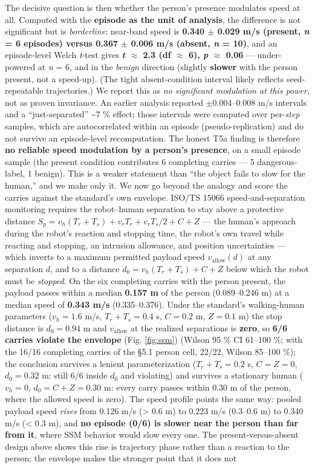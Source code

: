 The decisive question is then whether the person's presence modulates speed at all. Computed with the \textbf{episode as the unit of analysis}, the difference is not significant but is \emph{borderline}: near-band speed is \textbf{0.340 $\pm$ 0.029 m/s (present, \emph{n} = 6 episodes) versus 0.367 $\pm$ 0.006 m/s (absent, \emph{n} = 10)}, and an episode-level Welch \emph{t}-test gives \textbf{\emph{t} $\approx$ 2.3 (df $\approx$ 6), \emph{p} $\approx$ 0.06} --- under-powered at \emph{n} = 6, and in the \emph{benign} direction (slightly \textbf{slower} with the person present, not a speed-up). (The tight absent-condition interval likely reflects seed-repeatable trajectories.) We report this as \emph{no significant modulation at this power}, not as proven invariance. An earlier analysis reported $\pm$0.004--0.008 m/s intervals and a ``just-separated'' \textasciitilde{}7 \% effect; those intervals were computed over per-\emph{step} samples, which are autocorrelated within an episode (pseudo-replication) and do not survive an episode-level recomputation. The honest T5a finding is therefore \textbf{no reliable speed modulation by a person's presence}, on a small episode sample (the present condition contributes 6 completing carries --- 5 dangerous-label, 1 benign). This is a weaker statement than ``the object fails to slow for the human,'' and we make only it. We now go beyond the analogy and score the carries against the standard's own envelope. ISO/TS 15066 speed-and-separation monitoring requires the robot--human separation to stay above a protective distance $S_p = v_h(T_r+T_s) + v_r T_r + v_r T_s/2 + C + Z$ \citep{ref11,ref20} --- the human's approach during the robot's reaction and stopping time, the robot's own travel while reacting and stopping, an intrusion allowance, and position uncertainties --- which inverts to a maximum permitted payload speed $v_{\text{allow}}(d)$ at any separation $d$, and to a distance $d_0 = v_h(T_r+T_s)+C+Z$ below which the robot must be \emph{stopped}. On the six completing carries with the person present, the payload passes within a median \textbf{0.157 m} of the person (0.089--0.246 m) at a median speed of \textbf{0.343 m/s} (0.335--0.376). Under the standard's walking-human parameters ($v_h = 1.6$ m/s, $T_r+T_s = 0.4$ s, $C = 0.2$ m, $Z = 0.1$ m) the stop distance is $d_0 = 0.94$ m and $v_{\text{allow}}$ at the realized separations is \textbf{zero}, so \textbf{6/6 carries violate the envelope} (Fig. \ref{fig:ssm}) (Wilson 95 \% CI 61--100 \%; with the 16/16 completing carries of the \S5.1 person cell, 22/22, Wilson 85--100 \%); the conclusion survives a lenient parameterization ($T_r+T_s = 0.2$ s, $C = Z = 0$, $d_0 = 0.32$ m: still 6/6 inside $d_0$ and violating) and survives a stationary human ($v_h = 0$, $d_0 = C + Z = 0.30$ m: every carry passes within 0.30 m of the person, where the allowed speed is zero). The speed profile points the same way: pooled payload speed \emph{rises} from 0.126 m/s (> 0.6 m) to 0.223 m/s (0.3--0.6 m) to 0.340 m/s (< 0.3 m), and \textbf{no episode (0/6) is slower near the person than far from it}, where SSM behavior would slow every one. The present-versus-absent design above shows this rise is trajectory phase rather than a reaction to the person; the envelope makes the stronger point that it does not 